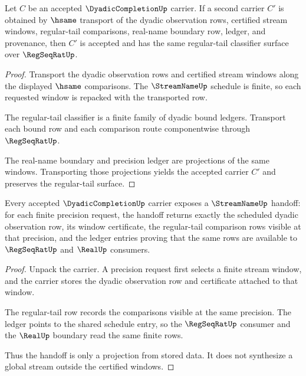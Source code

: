 \begin{theorem}
\label{thm:dyadiccompletion-regular-tail-stability}
Let $C$ be an accepted $\DyadicCompletionUp$ carrier. If a second carrier
$C'$ is obtained by $\hsame$ transport of the dyadic observation rows, certified
stream windows, regular-tail comparisons, real-name boundary row, ledger, and
provenance, then $C'$ is accepted and has the same regular-tail classifier
surface over $\RegSeqRatUp$.
\end{theorem}
\begin{proof}
Transport the dyadic observation rows and certified stream windows along the
displayed $\hsame$ comparisons. The $\StreamNameUp$ schedule is finite, so each
requested window is repacked with the transported row.

The regular-tail classifier is a finite family of dyadic bound ledgers. Transport
each bound row and each comparison route componentwise through $\RegSeqRatUp$.

The real-name boundary and precision ledger are projections of the same windows.
Transporting those projections yields the accepted carrier $C'$ and preserves
the regular-tail surface.
\end{proof}

\begin{theorem}
\label{thm:dyadiccompletion-streamname-handoff}
Every accepted $\DyadicCompletionUp$ carrier exposes a $\StreamNameUp$ handoff:
for each finite precision request, the handoff returns exactly the scheduled
dyadic observation row, its window certificate, the regular-tail comparison rows
visible at that precision, and the ledger entries proving that the same rows
are available to $\RegSeqRatUp$ and $\RealUp$ consumers.
\end{theorem}
\begin{proof}
Unpack the carrier. A precision request first selects a finite stream window,
and the carrier stores the dyadic observation row and certificate attached to
that window.

The regular-tail row records the comparisons visible at the same precision. The
ledger points to the shared schedule entry, so the $\RegSeqRatUp$ consumer and
the $\RealUp$ boundary read the same finite rows.

Thus the handoff is only a projection from stored data. It does not synthesize a
global stream outside the certified windows.
\end{proof}

